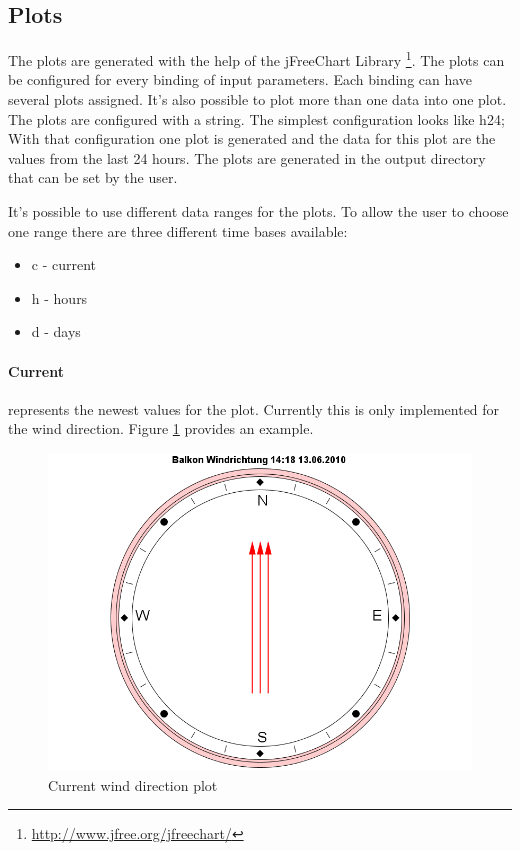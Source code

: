 \subsection{Plots} %
\label{sub:plots}
The plots are generated with the help of the jFreeChart Library \footnote{\url{http://www.jfree.org/jfreechart/}}.
The plots can be configured for every binding of input parameters. Each binding can have several plots assigned. It's also possible to plot more than one data into one plot. The plots are configured with a string. The simplest configuration looks like {\C h24;} With that configuration one plot is generated and the data for this plot are the values from the last 24 hours. The plots are generated in the output directory that can be set by the user.

It's possible to use different data ranges for the plots. To allow the user to choose one range there are three different time bases available:
\begin{itemize}
	\item c - current
	\item h - hours
	\item d - days
\end{itemize}

\paragraph{Current} %
\label{par:current}
represents the newest values for the plot. Currently this is only implemented for the wind direction. Figure \ref{fig:current} provides an example.
\begin{figure}[ht]
    \centering
    \includegraphics[width=0.9\linewidth]{master/plot_examplec.png}
    \caption{Current wind direction plot}
    \label{fig:current}
\end{figure}

